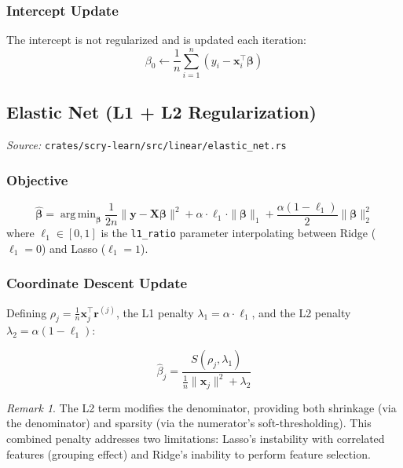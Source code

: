 \documentclass[11pt,a4paper]{article}
\theoremstyle{definition}
\theoremstyle{remark}
\newtheorem{remark}[theorem]{Remark}
\DeclareMathOperator*{\argmin}{arg\,min}
\begin{document}
\subsubsection*{Intercept Update}

The intercept is not regularized and is updated each iteration:
\begin{equation}
\beta_0 \leftarrow \frac{1}{n}\sum_{i=1}^n (y_i - \mathbf{x}_i^\top\boldsymbol{\beta})
\end{equation}

\subsection{Elastic Net (L1 + L2 Regularization)}
\label{sec:elastic-net}

\noindent\textit{Source:} \texttt{crates/scry-learn/src/linear/elastic\_net.rs}

\subsubsection*{Objective}
\begin{equation}
\hat{\boldsymbol{\beta}} = \argmin_{\boldsymbol{\beta}} \frac{1}{2n}\|\mathbf{y} - \mathbf{X}\boldsymbol{\beta}\|^2 + \alpha\cdot\ell_1 \cdot \|\boldsymbol{\beta}\|_1 + \frac{\alpha(1-\ell_1)}{2}\|\boldsymbol{\beta}\|_2^2
\end{equation}
where $\ell_1 \in [0,1]$ is the \texttt{l1\_ratio} parameter interpolating between Ridge ($\ell_1 = 0$) and Lasso ($\ell_1 = 1$).

\subsubsection*{Coordinate Descent Update}

Defining $\rho_j = \frac{1}{n}\mathbf{x}_j^\top\mathbf{r}^{(j)}$, the L1 penalty $\lambda_1 = \alpha \cdot \ell_1$, and the L2 penalty $\lambda_2 = \alpha(1-\ell_1)$:

\begin{equation}
\hat{\beta}_j = \frac{S(\rho_j, \lambda_1)}{\frac{1}{n}\|\mathbf{x}_j\|^2 + \lambda_2}
\end{equation}

\begin{remark}
The L2 term modifies the denominator, providing both shrinkage (via the denominator) and sparsity (via the numerator's soft-thresholding). This combined penalty addresses two limitations: Lasso's instability with correlated features (grouping effect) and Ridge's inability to perform feature selection.
\end{remark}
\end{document}
